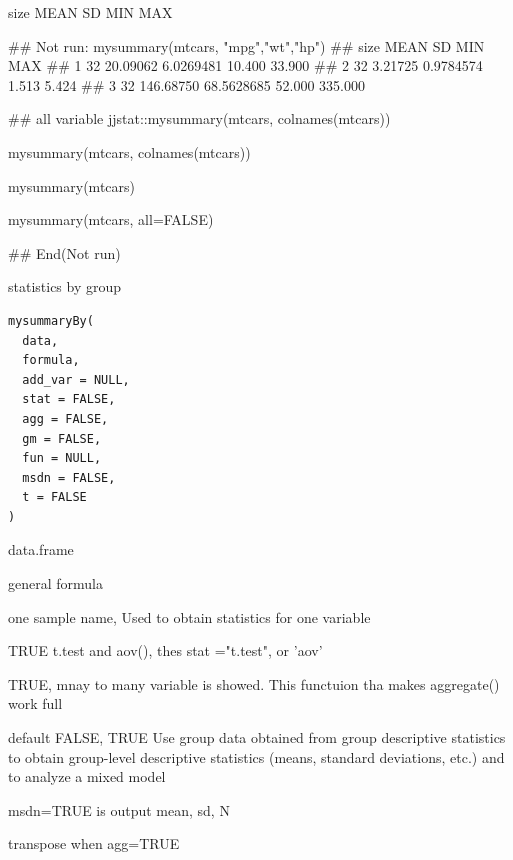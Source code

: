 \documentclass[a4paper]{book}
\begin{document}
%
\begin{Value}
size   MEAN    SD  MIN  MAX
\end{Value}
%
\begin{Examples}
\begin{ExampleCode}
\#\# Not run: 
mysummary(mtcars, "mpg","wt","hp")
## size      MEAN         SD    MIN     MAX
## 1   32  20.09062  6.0269481 10.400  33.900
## 2   32   3.21725  0.9784574  1.513   5.424
## 3   32 146.68750 68.5628685 52.000 335.000

## all variable
 jjstat::mysummary(mtcars, colnames(mtcars))

mysummary(mtcars, colnames(mtcars))

mysummary(mtcars)

mysummary(mtcars, all=FALSE)


## End(Not run)
\end{ExampleCode}
\end{Examples}
%
\begin{Description}
statistics by group
\end{Description}
%
\begin{Usage}
\begin{verbatim}
mysummaryBy(
  data,
  formula,
  add_var = NULL,
  stat = FALSE,
  agg = FALSE,
  gm = FALSE,
  fun = NULL,
  msdn = FALSE,
  t = FALSE
)
\end{verbatim}
\end{Usage}
%
\begin{Arguments}
\begin{ldescription}
\item[\code{data}] data.frame

\item[\code{formula}] general formula

\item[\code{add\_var}] one sample name, Used to obtain statistics for one variable

\item[\code{stat}] TRUE t.test and aov(), thes stat ="t.test", or 'aov'

\item[\code{agg}] TRUE, mnay to many variable is showed. This functuion tha makes aggregate() work full

\item[\code{gm}] default FALSE, TRUE Use group data obtained from group descriptive statistics to obtain group-level descriptive statistics (means, standard deviations, etc.) and to analyze a mixed model

\item[\code{msdn}] msdn=TRUE is output mean, sd, N

\item[\code{t}] transpose  when agg=TRUE
\end{ldescription}
\end{Arguments}
\end{document}
